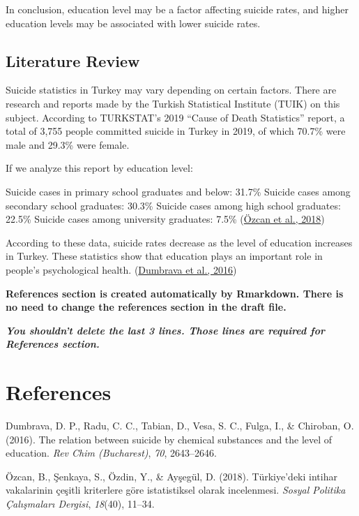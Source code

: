 \documentclass[
  12pt,
]{article}
\newlength{\cslhangindent}
\newlength{\cslentryspacingunit} %
\newenvironment{CSLReferences}[2] %
 {%
  \setlength{\parindent}{0pt}
  \ifodd #1
  \let\oldpar\par
  \def\par{\hangindent=\cslhangindent\oldpar}
  \fi
  \setlength{\parskip}{#2\cslentryspacingunit}
 }%
 {}
\begin{document}
In conclusion, education level may be a factor affecting suicide rates, and higher education levels may be associated with lower suicide rates.

\hypertarget{literature-review}{%
\subsection{Literature Review}\label{literature-review}}

Suicide statistics in Turkey may vary depending on certain factors. There are research and reports made by the Turkish Statistical Institute (TUIK) on this subject. According to TURKSTAT's 2019 ``Cause of Death Statistics'' report, a total of 3,755 people committed suicide in Turkey in 2019, of which 70.7\% were male and 29.3\% were female.

If we analyze this report by education level:

Suicide cases in primary school graduates and below: 31.7\%
Suicide cases among secondary school graduates: 30.3\%
Suicide cases among high school graduates: 22.5\%
Suicide cases among university graduates: 7.5\% (\protect\hyperlink{ref-ozcan2018turkiye}{Özcan et al., 2018})

According to these data, suicide rates decrease as the level of education increases in Turkey. These statistics show that education plays an important role in people's psychological health. (\protect\hyperlink{ref-dumbrava2016relation}{Dumbrava et al., 2016})

\textbf{References section is created automatically by Rmarkdown. There is no need to change the references section in the draft file.}

\textbf{\emph{You shouldn't delete the last 3 lines. Those lines are required for References section.}}

\newpage

\hypertarget{references}{%
\section{References}\label{references}}

\hypertarget{refs}{}
\begin{CSLReferences}{1}{0}
\leavevmode{}%
Dumbrava, D. P., Radu, C. C., Tabian, D., Vesa, S. C., Fulga, I., \& Chiroban, O. (2016). The relation between suicide by chemical substances and the level of education. \emph{Rev Chim (Bucharest)}, \emph{70}, 2643--2646.

\leavevmode{}%
Özcan, B., Şenkaya, S., Özdin, Y., \& Ayşegül, D. (2018). T{ü}rkiye'deki intihar vakalarinin {ç}e{ş}itli kriterlere g{ö}re istatistiksel olarak incelenmesi. \emph{Sosyal Politika {Ç}al{ı}{ş}malar{ı} Dergisi}, \emph{18}(40), 11--34.

\end{CSLReferences}
\end{document}
